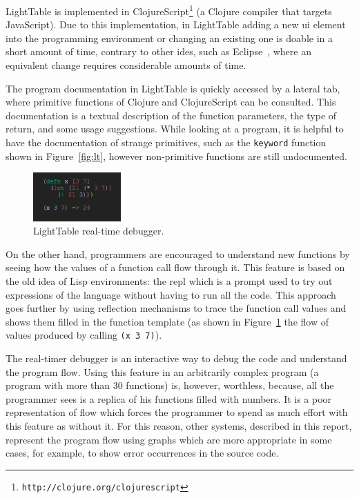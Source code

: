 LightTable is implemented in ClojureScript\footnote{\texttt{http://clojure.org/clojurescript}} (a Clojure compiler that targets JavaScript). Due to this implementation, in LightTable adding a new \gls{ui} element into the programming environment or changing an existing one is doable in a short amount of time, contrary to other \glspl{ide}, such as Eclipse~\cite{carlson2005eclipse}, where an equivalent change requires considerable amounts of time. 

The program documentation in LightTable is quickly accessed by a lateral tab, where primitive functions of Clojure and ClojureScript can be consulted. This documentation is a textual description of the function parameters, the type of return, and some usage suggestions. While looking at a program, it is helpful to have the documentation of strange primitives, such as the \texttt{keyword} function shown in Figure~\ref{fig:lt}, however non-primitive functions are still undocumented. 

\begin{figure}
  \begin{center}
    \includegraphics[width=0.3\textwidth]{images/eval-close}
  \end{center}
 \caption{LightTable real-time debugger.}  
    \label{fig:lt2}
\end{figure}

On the other hand, programmers are encouraged to understand new functions by seeing how the values of a function call flow through it. This feature is based on the old idea of Lisp environments: the \gls{repl} which is a prompt used to try out expressions of the language without having to run all the code. This approach goes further by using reflection mechanisms to trace the function call values and shows them filled in the function template (as shown in Figure~\ref{fig:lt2} the flow of values produced by calling \texttt{(x 3 7)}).

The real-timer debugger is an interactive way to debug the code and understand the program flow. Using this feature in an arbitrarily complex program (a program with more than 30 functions) is, however, worthless, because, all the programmer sees is a replica of his functions filled with numbers. It is a poor representation of flow which forces the programmer to spend as much effort with this feature as without it. For this reason, other systems, described in this report, represent the program flow using graphs which are more appropriate in some cases, for example, to show error occurrences in the source code.

